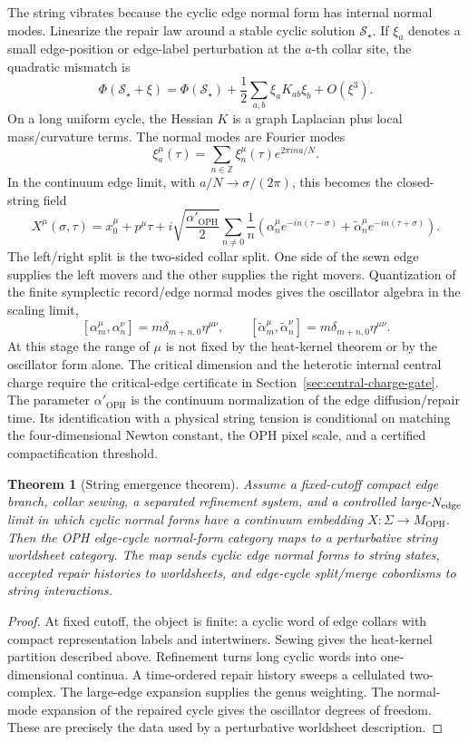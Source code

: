 \documentclass[11pt]{article}
\newtheorem{theorem}{Theorem}[section]
\theoremstyle{remark}
\theoremstyle{plain}
\newcommand{\OPH}{\mathrm{OPH}}
\begin{document}
The string vibrates because the cyclic edge normal form has internal normal modes. Linearize the
repair law around a stable cyclic solution \(\mathcal S_\star\). If \(\xi_a\) denotes a small
edge-position or edge-label perturbation at the \(a\)-th collar site, the quadratic mismatch is
\[
\Phi(\mathcal S_\star+\xi)=\Phi(\mathcal S_\star)
+\frac12\sum_{a,b}\xi_a K_{ab}\xi_b+O(\xi^3).
\]
On a long uniform cycle, the Hessian \(K\) is a graph Laplacian plus local mass/curvature terms.
The normal modes are Fourier modes
\[
\xi_a^\mu(\tau)=\sum_{n\in\mathbb Z}\xi_n^\mu(\tau)e^{2\pi i n a/N}.
\]
In the continuum edge limit, with \(a/N\to\sigma/(2\pi)\), this becomes the closed-string field
\[
X^\mu(\sigma,\tau)=x_0^\mu+p^\mu\tau+
 i\sqrt{\frac{\alpha'_{\OPH}}{2}}
\sum_{n\ne0}\frac1n
\left(\alpha_n^\mu e^{-in(\tau-\sigma)}+\tilde\alpha_n^\mu e^{-in(\tau+\sigma)}\right).
\]
The left/right split is the two-sided collar split. One side of the sewn edge supplies the left
movers and the other supplies the right movers. Quantization of the finite symplectic record/edge
normal modes gives the oscillator algebra in the scaling limit,
\[
[\alpha_m^\mu,\alpha_n^\nu]=m\delta_{m+n,0}\eta^{\mu\nu},
\qquad
[\tilde\alpha_m^\mu,\tilde\alpha_n^\nu]=m\delta_{m+n,0}\eta^{\mu\nu}.
\]
At this stage the range of \(\mu\) is not fixed by the heat-kernel theorem or by the oscillator
form alone. The critical dimension and the heterotic internal central charge require the
critical-edge certificate in Section~\ref{sec:central-charge-gate}.
The parameter \(\alpha'_{\OPH}\) is the continuum normalization of the edge diffusion/repair time.
Its identification with a physical string tension is conditional on matching the four-dimensional
Newton constant, the OPH pixel scale, and a certified compactification threshold.

\begin{theorem}[String emergence theorem]
Assume a fixed-cutoff compact edge branch, collar sewing, a separated refinement system, and a
controlled large-\(N_{\rm edge}\) limit in which cyclic normal forms have a continuum embedding
\(X:\Sigma\to M_{\OPH}\). Then the OPH edge-cycle normal-form category maps to a perturbative
string worldsheet category. The map sends cyclic edge normal forms to string states, accepted
repair histories to worldsheets, and edge-cycle split/merge cobordisms to string interactions.
\end{theorem}

\begin{proof}
At fixed cutoff, the object is finite: a cyclic word of edge collars with compact representation
labels and intertwiners. Sewing gives the heat-kernel partition described above. Refinement turns
long cyclic words into one-dimensional continua. A time-ordered repair history sweeps a
cellulated two-complex. The large-edge expansion supplies the genus weighting. The normal-mode
expansion of the repaired cycle gives the oscillator degrees of freedom. These are precisely the
data used by a perturbative worldsheet description.
\end{proof}
\end{document}
